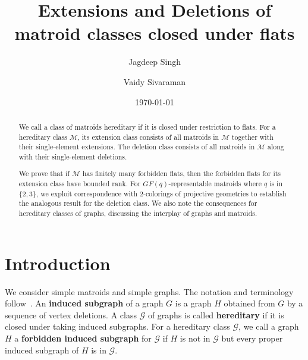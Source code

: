 \documentclass[11pt]{amsart}
\theoremstyle{definition}
\theoremstyle{remark}
\numberwithin{equation}{section}
\begin{document}
\title[Hereditary classes of matroids]{Extensions and Deletions of matroid classes closed under flats}




\author{Jagdeep Singh}
\address{Department of Mathematics and Statistics\\
Mississippi State University\\
Mississippi}

\author{Vaidy Sivaraman}
\address{Department of Mathematics and Statistics\\
Mississippi State University\\
Mississippi}








\date{\today}



\begin{abstract}
We call a class of matroids hereditary if it is closed under restriction to flats. For a hereditary class $\mathcal{M}$, its extension class consists of all matroids in $\mathcal{M}$ together with their single-element extensions. The deletion class consists of all matroids in $\mathcal{M}$ along with their single-element deletions.

We prove that if $\mathcal{M}$ has finitely many forbidden flats, then the forbidden flats for its extension class have bounded rank. For $GF(q)$-representable matroids where $q$ is in $\{2,3\}$, we exploit correspondence with $2$-colorings of projective geometries to establish the analogous result for the deletion class. We also note the consequences for hereditary classes of graphs, discussing the interplay of graphs and matroids.
\end{abstract}



\maketitle



\section{Introduction}
\label{intro}
We consider simple matroids and simple graphs. The notation and terminology follow~\cite{ox2}. An {\bf induced subgraph} of a graph $G$ is a graph $H$ obtained from $G$ by a sequence of vertex deletions. A class $\mathcal{G}$ of graphs is called {\bf hereditary} if it is closed under taking induced subgraphs. For a hereditary class $\mathcal{G}$, we call a graph $H$ a {\bf forbidden induced subgraph} for $\mathcal{G}$ if $H$ is not in $\mathcal{G}$ but every proper induced subgraph of $H$ is in $\mathcal{G}$. 
\end{document}
